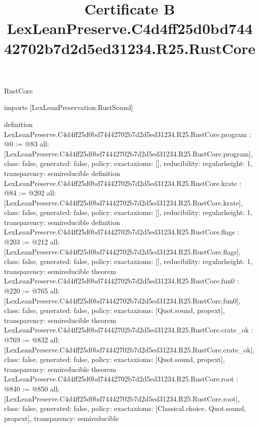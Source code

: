 \begin{lexlean}{RustCore}
\title{Certificate B LexLeanPreserve.C4d4ff25d0bd74442702b7d2d5ed31234.R25.RustCore}
\begin{coremodule}
imports [LexLeanPreservation.RustSound]

definition LexLeanPreserve.C4d4ff25d0bd74442702b7d2d5ed31234.R25.RustCore.program : @0 := @83 {
  all: [LexLeanPreserve.C4d4ff25d0bd74442702b7d2d5ed31234.R25.RustCore.program],
  class: false,
  generated: false,
  policy: exact{axioms: []},
  reducibility: regular{height: 1},
  transparency: semireducible
}
definition LexLeanPreserve.C4d4ff25d0bd74442702b7d2d5ed31234.R25.RustCore.krate : @84 := @202 {
  all: [LexLeanPreserve.C4d4ff25d0bd74442702b7d2d5ed31234.R25.RustCore.krate],
  class: false,
  generated: false,
  policy: exact{axioms: []},
  reducibility: regular{height: 1},
  transparency: semireducible
}
definition LexLeanPreserve.C4d4ff25d0bd74442702b7d2d5ed31234.R25.RustCore.flags : @203 := @212 {
  all: [LexLeanPreserve.C4d4ff25d0bd74442702b7d2d5ed31234.R25.RustCore.flags],
  class: false,
  generated: false,
  policy: exact{axioms: []},
  reducibility: regular{height: 1},
  transparency: semireducible
}
theorem LexLeanPreserve.C4d4ff25d0bd74442702b7d2d5ed31234.R25.RustCore.fun0 : @220 := @765 {
  all: [LexLeanPreserve.C4d4ff25d0bd74442702b7d2d5ed31234.R25.RustCore.fun0],
  class: false,
  generated: false,
  policy: exact{axioms: [Quot.sound, propext]},
  transparency: semireducible
}
theorem LexLeanPreserve.C4d4ff25d0bd74442702b7d2d5ed31234.R25.RustCore.crate_ok : @769 := @832 {
  all: [LexLeanPreserve.C4d4ff25d0bd74442702b7d2d5ed31234.R25.RustCore.crate_ok],
  class: false,
  generated: false,
  policy: exact{axioms: [Quot.sound, propext]},
  transparency: semireducible
}
theorem LexLeanPreserve.C4d4ff25d0bd74442702b7d2d5ed31234.R25.RustCore.root : @840 := @850 {
  all: [LexLeanPreserve.C4d4ff25d0bd74442702b7d2d5ed31234.R25.RustCore.root],
  class: false,
  generated: false,
  policy: exact{axioms: [Classical.choice, Quot.sound, propext]},
  transparency: semireducible
}


\end{coremodule}
\end{lexlean}
